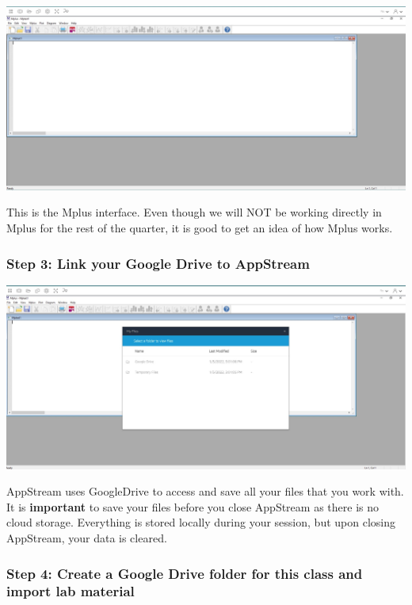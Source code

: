 \documentclass[
]{article}
\begin{document}
\includegraphics{mplus.jpg}

This is the Mplus interface. Even though we will NOT be working directly
in Mplus for the rest of the quarter, it is good to get an idea of how
Mplus works.

\hypertarget{step-3-link-your-google-drive-to-appstream}{%
\subsubsection{Step 3: Link your Google Drive to
AppStream}\label{step-3-link-your-google-drive-to-appstream}}

\includegraphics{gd.jpg}

AppStream uses GoogleDrive to access and save all your files that you
work with. It is \textbf{important} to save your files before you close
AppStream as there is no cloud storage. Everything is stored locally
during your session, but upon closing AppStream, your data is cleared.

\hypertarget{step-4-create-a-google-drive-folder-for-this-class-and-import-lab-material}{%
\subsubsection{Step 4: Create a Google Drive folder for this class and
import lab
material}\label{step-4-create-a-google-drive-folder-for-this-class-and-import-lab-material}}
\end{document}
